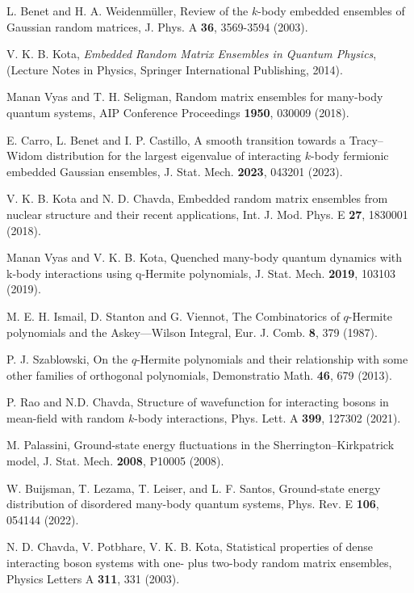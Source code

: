\begin{thebibliography}{99}
 L.  Benet and H.  A.  Weidenm\"{u}ller, Review of the $k$-body embedded ensembles of Gaussian random matrices, J. Phys. A {\bf 36},  3569-3594 (2003).

 V. K. B. Kota,  {\it Embedded Random Matrix Ensembles in Quantum Physics}, (Lecture Notes in Physics, Springer International Publishing, 2014).

 Manan Vyas and T.  H.  Seligman,  Random matrix ensembles for many-body quantum systems, AIP Conference Proceedings {\bf 1950},  030009 (2018).

 E. Carro, L. Benet and I. P. Castillo, A smooth transition towards a Tracy–Widom distribution for the largest eigenvalue of interacting $k$-body fermionic embedded Gaussian ensembles, J. Stat. Mech. {\bf 2023}, 043201 (2023).

 V. K. B. Kota and N. D. Chavda, Embedded random matrix ensembles from nuclear structure and their recent applications, Int.  J.  Mod.  Phys.  E {\bf 27}, 1830001 (2018).

 Manan Vyas and V. K. B. Kota,  Quenched many-body quantum dynamics with k-body interactions using q-Hermite polynomials,  J. Stat. Mech. {\bf 2019}, 103103 (2019).

 M. E. H.  Ismail, D. Stanton and G. Viennot,  The Combinatorics of $q$-Hermite polynomials and the Askey—Wilson Integral, Eur.  J.  Comb.  {\bf 8},  379 (1987).

 P. J.  Szablowski,  On the $q$-Hermite polynomials and their relationship with some other families of orthogonal polynomials, Demonstratio Math.  {\bf 46}, 679 (2013).

 P. Rao and N.D. Chavda, Structure of wavefunction for interacting bosons in mean-field with random $k$-body interactions, Phys. Lett. A {\bf 399}, 127302 (2021).

 M. Palassini,  Ground-state energy fluctuations in the Sherrington–Kirkpatrick model, J. Stat. Mech. {\bf 2008}, P10005 (2008).

 W. Buijsman, T. Lezama,  T. Leiser, and L. F.  Santos, Ground-state energy distribution of disordered many-body quantum systems, Phys. Rev. E {\bf 106}, 054144 (2022).

 N. D. Chavda, V.  Potbhare, V. K. B.  Kota,  Statistical properties of dense interacting boson systems with one- plus two-body random matrix ensembles,  Physics Letters A {\bf 311}, 331 (2003).


\end{thebibliography}
